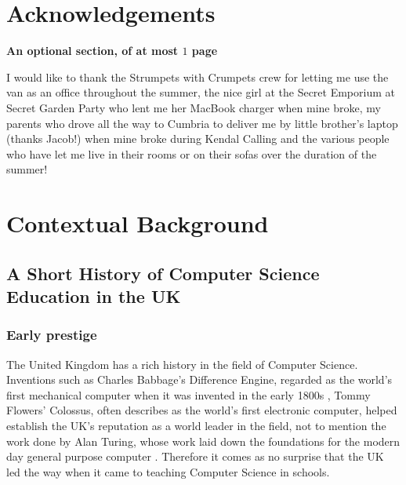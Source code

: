 \documentclass[ %
                    author={Jonathan Rankin},
                supervisor={Dr. David May, Dr. Ian Holyer},
                    degree={MEng},
                     title={CodeTouch},
                  subtitle={A Revolutionary Way To Program Real Code On Touch Screen Devices},
                      type={enterprise},
                      year={2015 } ]{dissertation}
\begin{document}
\chapter*{Acknowledgements}

{\bf An optional section, of at most $1$ page}
\vspace{1cm} 

\noindent
I would like to thank the Strumpets with Crumpets crew for letting me use the van as an office throughout the summer, the nice girl at the Secret Emporium at Secret Garden Party who lent me her MacBook charger when mine broke, my parents who drove all the way to Cumbria to deliver me by little brother's laptop (thanks Jacob!) when mine broke during Kendal Calling and the various people who have let me live in their rooms or on their sofas over the duration of the summer!


%

\mainmatter


\chapter{Contextual Background}
\label{chap:context}

\section {A Short History of Computer Science Education in the UK}

\subsection{Early prestige}

The United Kingdom has a rich history in the field of Computer Science. Inventions such as Charles Babbage's Difference Engine, regarded as the world's first mechanical computer when it was invented in the early 1800s \cite{Swade:2001:DEC:940732}, Tommy Flowers' Colossus, often describes as the world's first electronic computer, \cite{mackintosh2008first} helped establish the UK's reputation as a world leader in the field, not to mention the work done by Alan Turing, whose work laid down the foundations for the modern day general purpose computer \cite{Newman253}. Therefore it comes as no surprise that the UK led the way when it came to teaching Computer Science in schools. 
\end{document}
